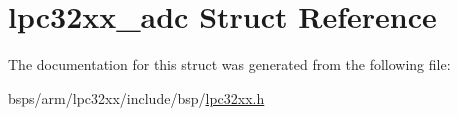 \hypertarget{structlpc32xx__adc}{}\section{lpc32xx\+\_\+adc Struct Reference}
\label{structlpc32xx__adc}


The documentation for this struct was generated from the following file\+:\begin{DoxyCompactItemize}
\item 
bsps/arm/lpc32xx/include/bsp/\mbox{\hyperlink{lpc32xx_8h}{lpc32xx.\+h}}\end{DoxyCompactItemize}
